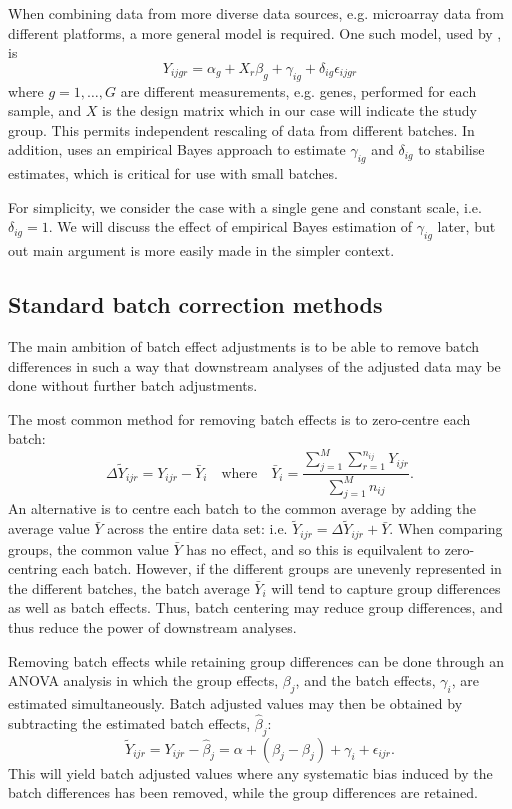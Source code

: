 \documentclass{bio}
\begin{document}
When combining data from more diverse data sources, e.g. microarray data from different platforms, a more general model is required. One such model, used by \citet{Johnson2007}, is
\begin{equation}
Y_{ijgr}=\alpha_g+X_r\beta_{g}+\gamma_{ig}+\delta_{ig}\epsilon_{ijgr}
\end{equation}
where $g=1,\ldots,G$ are different measurements, e.g. genes, performed for each sample, and $X$ is the design matrix which in our case will indicate the study group. This permits independent rescaling of data from different batches. In addition, \citet{Johnson2007} uses an empirical Bayes approach to estimate $\gamma_{ig}$ and $\delta_{ig}$ to stabilise estimates, which is critical for use with small batches.

For simplicity, we consider the case with a single gene and constant scale, i.e. $\delta_{ig}=1$. We will discuss the effect of empirical Bayes estimation of $\gamma_{ig}$ later, but out main argument is more easily made in the simpler context.

\subsection{Standard batch correction methods}

The main ambition of batch effect adjustments is to be able to remove batch differences in such a way that downstream analyses of the adjusted data may be done without further batch adjustments.

The most common method for removing batch effects is to zero-centre each batch:
\begin{equation}
\Delta\widetilde Y_{ijr}=Y_{ijr}-\bar{Y}_{i}
\quad\text{where}\quad
\bar{Y}_i=\frac{\sum_{j=1}^M\sum_{r=1}^{n_{ij}} Y_{ijr}}{\sum_{j=1}^M n_{ij}}.
\end{equation}
An alternative is to centre each batch to the common average by adding the average value $\bar{Y}$ across the entire data set: i.e. $\widetilde Y_{ijr}=\Delta\widetilde Y_{ijr}+\bar{Y}$. When comparing groups, the common value $\bar{Y}$ has no effect, and so this is equilvalent to zero-centring each batch. However, if the different groups are unevenly represented in the different batches, the batch average $\bar{Y}_i$ will tend to capture group differences as well as batch effects. Thus, batch centering may reduce group differences, and thus reduce the power of downstream analyses.

Removing batch effects while retaining group differences can be done through an ANOVA analysis in which the group effects, $\beta_j$, and the batch effects, $\gamma_i$, are estimated simultaneously. Batch adjusted values may then be obtained by subtracting the estimated batch effects, $\hat\beta_j$:
\begin{equation}
\widetilde Y_{ijr}=Y_{ijr}-\hat\beta_j=\alpha+(\beta_j-\hat\beta_j)+\gamma_i+\epsilon_{ijr}.
\end{equation}
This will yield batch adjusted values where any systematic bias induced by the batch differences has been removed, while the group differences are retained.
\end{document}
